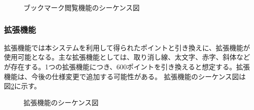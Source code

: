 \documentclass[a4j]{jarticle}
\begin{document}
  \begin{figure}[H]
    \centering
    \caption{ブックマーク閲覧機能のシーケンス図}
    \label{fig:mypage_bookmark.png}
  \end{figure}


  \subsubsection{拡張機能}
  拡張機能では本システムを利用して得られたポイントと引き換えに、拡張機能が使用可能となる。主な拡張機能としては、取り消し線、太文字、赤字、斜体などが存在する。1つの拡張機能につき、600ポイントを引き換えると想定する。拡張機能は、今後の仕様変更で追加する可能性がある。
  拡張機能のシーケンス図は図\ref{fig:mypage_extension.png}に示す。

  \begin{figure}[H]
    \centering
    \caption{拡張機能のシーケンス図}
    \label{fig:mypage_extension.png}
  \end{figure}
\end{document}

